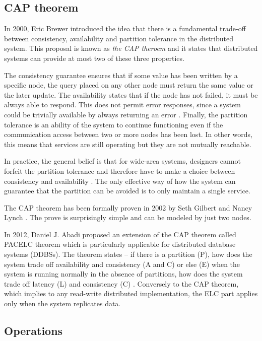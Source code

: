 \documentclass[oneside,
  digital, %
  table,   %
  lof,     %
  lot,     %
]{fithesis3}
\begin{document}
\subsection{CAP theorem}
\label{sec:cap-theorem}

In 2000, Eric Brewer introduced the idea that there is a fundamental trade-off between consistency, availability and partition tolerance \cite{persp_cap} in the distributed system. This proposal is known as \textit{the CAP theroem} and it states that distributed systems can provide at most two of these three properties.

The consistency guarantee ensures that if some value has been written by a specific node, the query placed on any other node must return the same value or the later update. The availability states that if the node has not failed, it must be always able to respond. This does not permit error responses, since a system could be trivially available by always returning an error \cite{cap_faq}. Finally, the partition tolerance is an ability of the system to continue functioning even if the communication access between two or more nodes has been lost. In other words, this means that services are still operating but they are not mutually reachable.

In practice, the general belief is that for wide-area systems, designers cannot forfeit the partition tolerance and therefore have to make a choice between consistency and availability \cite{cap_12years}. The only effective way of how the system can guarantee that the partition can be avoided is to only maintain a single service.

The CAP theorem has been formally proven in 2002 by Seth Gilbert and Nancy Lynch \cite{cap_prove}. The prove is surprisingly simple and can be modeled by just two nodes.

In 2012, Daniel J. Abadi proposed an extension of the CAP theorem called PACELC theorem which is particularly applicable for distributed database systems (DDBSs). The theorem states -- if there is a partition (P), how does the system trade off availability and consistency (A and C) or else (E) when the system is running normally in the absence of partitions, how does the system trade off latency (L) and consistency (C) \cite{pacelc}. Conversely to the CAP theorem, which implies to any read-write distributed implementation, the ELC part applies only when the system replicates data.

\subsection{Operations}
\end{document}
